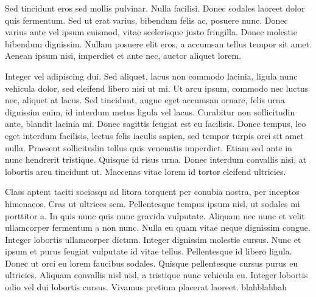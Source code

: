 \documentclass{elec6049report}     %
\begin{document}
Sed tincidunt eros sed mollis pulvinar. Nulla facilisi. Donec sodales laoreet dolor quis fermentum. Sed ut erat varius, bibendum felis ac, posuere nunc. Donec varius ante vel ipsum euismod, vitae scelerisque justo fringilla. Donec molestie bibendum dignissim. Nullam posuere elit eros, a accumsan tellus tempor sit amet. Aenean ipsum nisi, imperdiet et ante nec, auctor aliquet lorem.

Integer vel adipiscing dui. Sed aliquet, lacus non commodo lacinia, ligula nunc vehicula dolor, sed eleifend libero nisi ut mi. Ut arcu ipsum, commodo nec luctus nec, aliquet at lacus. Sed tincidunt, augue eget accumsan ornare, felis urna dignissim enim, id interdum metus ligula vel lacus. Curabitur non sollicitudin ante, blandit lacinia mi. Donec sagittis feugiat est eu facilisis. Donec tempus, leo eget interdum facilisis, lectus felis iaculis sapien, sed tempor turpis orci sit amet nulla. Praesent sollicitudin tellus quis venenatis imperdiet. Etiam sed ante in nunc hendrerit tristique. Quisque id risus urna. Donec interdum convallis nisi, at lobortis arcu tincidunt ut. Maecenas vitae lorem id tortor eleifend ultricies.

Class aptent taciti sociosqu ad litora torquent per conubia nostra, per inceptos himenaeos. Cras ut ultrices sem. Pellentesque tempus ipsum nisl, ut sodales mi porttitor a. In quis nunc quis nunc gravida vulputate. Aliquam nec nunc et velit ullamcorper fermentum a non nunc. Nulla eu quam vitae neque dignissim congue. Integer lobortis ullamcorper dictum. Integer dignissim molestie cursus. Nunc et ipsum et purus feugiat vulputate id vitae tellus. Pellentesque id libero ligula. Donec ut orci eu lorem faucibus sodales. Quisque pellentesque cursus purus eu ultricies. Aliquam convallis nisl nisl, a tristique nunc vehicula eu. Integer lobortis odio vel dui lobortis cursus. Vivamus pretium placerat laoreet.
blahblahbah



\backmatter


\end{document}
